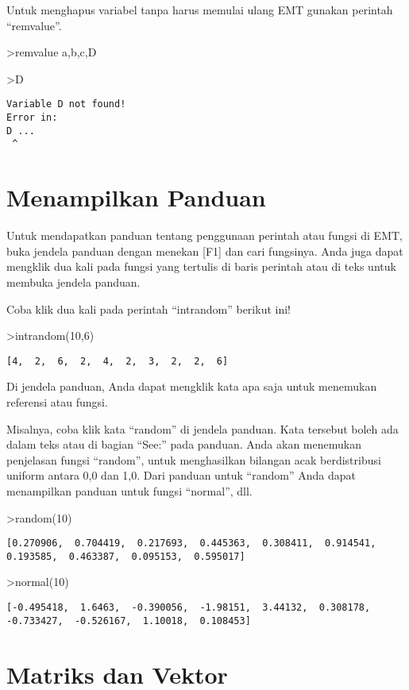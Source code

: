 \documentclass[
]{book}
\begin{document}
Untuk menghapus variabel tanpa harus memulai ulang EMT gunakan perintah ``remvalue''.

\textgreater remvalue a,b,c,D

\textgreater D

\begin{verbatim}
Variable D not found!
Error in:
D ...
 ^
\end{verbatim}

\chapter{Menampilkan Panduan}\label{menampilkan-panduan}

Untuk mendapatkan panduan tentang penggunaan perintah atau fungsi di EMT, buka jendela panduan dengan menekan {[}F1{]} dan cari fungsinya. Anda juga dapat mengklik dua kali pada fungsi yang tertulis di baris perintah atau di teks untuk membuka jendela panduan.

Coba klik dua kali pada perintah ``intrandom'' berikut ini!

\textgreater intrandom(10,6)

\begin{verbatim}
[4,  2,  6,  2,  4,  2,  3,  2,  2,  6]
\end{verbatim}

Di jendela panduan, Anda dapat mengklik kata apa saja untuk menemukan referensi atau fungsi.

Misalnya, coba klik kata ``random'' di jendela panduan. Kata tersebut boleh ada dalam teks atau di bagian ``See:'' pada panduan. Anda akan menemukan penjelasan fungsi ``random'', untuk menghasilkan bilangan acak berdistribusi uniform antara 0,0 dan 1,0. Dari panduan untuk ``random'' Anda dapat menampilkan panduan untuk fungsi ``normal'', dll.

\textgreater random(10)

\begin{verbatim}
[0.270906,  0.704419,  0.217693,  0.445363,  0.308411,  0.914541,
0.193585,  0.463387,  0.095153,  0.595017]
\end{verbatim}

\textgreater normal(10)

\begin{verbatim}
[-0.495418,  1.6463,  -0.390056,  -1.98151,  3.44132,  0.308178,
-0.733427,  -0.526167,  1.10018,  0.108453]
\end{verbatim}

\chapter{Matriks dan Vektor}\label{matriks-dan-vektor}
\end{document}
